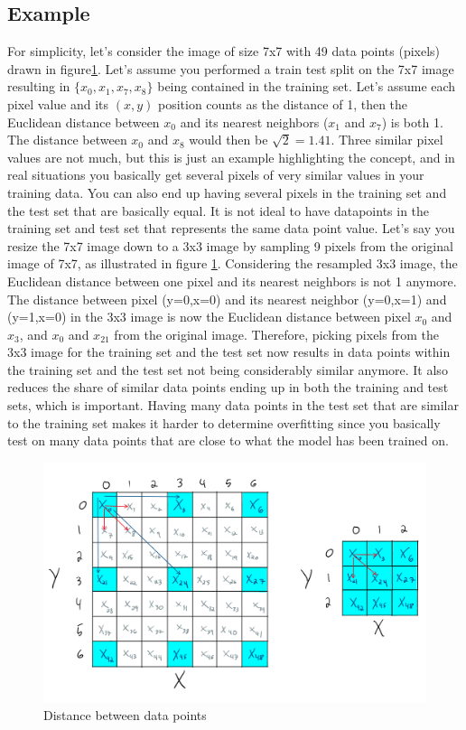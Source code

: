 \documentclass[11pt, a4paper]{article}
\begin{document}
\subsection*{Example}
For simplicity, let’s consider the image of size 7x7
with 49 data points (pixels) drawn in figure\ref{fig:image_resizing}. Let's assume you performed a train test split on the 7x7 image resulting in $\{x_0,x_1,x_7,x_8\}$ being contained in the
training set. Let's assume each pixel value and its $(x,y)$ position counts as the distance of 1, then the Euclidean distance between $x_0$ and its nearest neighbors ($x_1$ and $x_7$) is both 1.
The distance between $x_0$ and $x_8$ would then be $\sqrt{2}=1.41$.
Three similar pixel values are not much, but this is just an example highlighting the concept, and in real situations you basically get several pixels of very similar values in your training data.
You can also end up having several pixels in the training set and the test set that are basically equal. It is not ideal to have datapoints in the training set and test set that represents the same data point value.
Let’s say you resize the 7x7 image down to a 3x3 image by sampling 9 pixels from the original image of 7x7, as illustrated in figure \ref{fig:image_resizing}. Considering the resampled 3x3 image,
the Euclidean distance between one pixel and its nearest neighbors is not 1 anymore. The distance between pixel (y=0,x=0) and its nearest neighbor (y=0,x=1) and (y=1,x=0)
in the 3x3 image is now the Euclidean distance between pixel $x_0$ and $x_3$, and $x_0$ and $x_{21}$ from the original image. Therefore, picking pixels from the 3x3 image for the training
set and the test set now results in data points within the training set and the test set not being considerably similar anymore. It also reduces the share of similar data
points ending up in both the training and test sets, which is important. Having many data points in the test set that are similar to the training set makes it harder to
determine overfitting since you basically test on many data points that are close to what the model has been trained on.
\begin{figure}
  \centering
  \includegraphics[scale=0.28]{figures/EX6_resizing.png}
  \caption{Distance between data points}
  \label{fig:image_resizing}
\end{figure}
\end{document}
